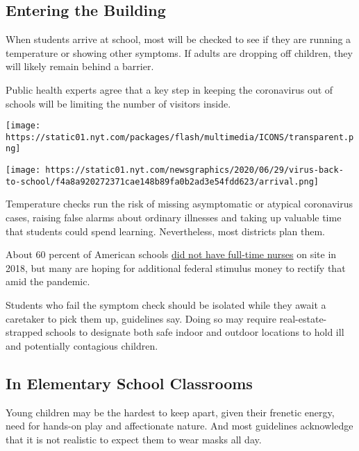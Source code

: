 \hypertarget{entering-the-building}{%
\subsection{Entering the Building}\label{entering-the-building}}

When students arrive at school, most will be checked to see if they are
running a temperature or showing other symptoms. If adults are dropping
off children, they will likely remain behind a barrier.

Public health experts agree that a key step in keeping the coronavirus
out of schools will be limiting the number of visitors inside.

\texttt{[image: https://static01.nyt.com/packages/flash/multimedia/ICONS/transparent.png]}

\texttt{[image: https://static01.nyt.com/newsgraphics/2020/06/29/virus-back-to-school/f4a8a920272371cae148b89fa0b2ad3e54fdd623/arrival.png]}

Temperature checks run the risk of missing asymptomatic or atypical
coronavirus cases, raising false alarms about ordinary illnesses and
taking up valuable time that students could spend learning.
Nevertheless, most districts plan them.

About 60 percent of American schools
\href{https://higherlogicdownload.s3.amazonaws.com/NASN/3870c72d-fff9-4ed7-833f-215de278d256/UploadedImages/PDFs/Advocacy/2017_Workforce_Study_Infographic_School_Nurses_in_the_Nation.pdf}{did
not have full-time nurses} on site in 2018, but many are hoping for
additional federal stimulus money to rectify that amid the pandemic.

Students who fail the symptom check should be isolated while they await
a caretaker to pick them up, guidelines say. Doing so may require
real-estate-strapped schools to designate both safe indoor and outdoor
locations to hold ill and potentially contagious children.

\hypertarget{in-elementary-school-classrooms}{%
\subsection{In Elementary School
Classrooms}\label{in-elementary-school-classrooms}}

Young children may be the hardest to keep apart, given their frenetic
energy, need for hands-on play and affectionate nature. And most
guidelines acknowledge that it is not realistic to expect them to wear
masks all day.

